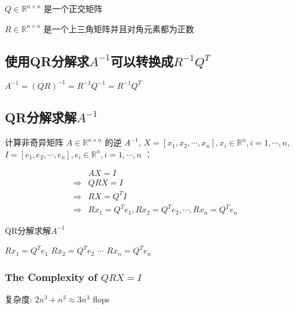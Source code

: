 \begin{corollary}
    $ Q \in \mathbb{R}^{n \times n} $ 是一个正交矩阵
\end{corollary}

\begin{corollary}
    $ R \in \mathbb{R}^{n \times n} $ 是一个上三角矩阵并且对角元素都为正数
\end{corollary}


\subsection{使用QR分解求$A^{-1}$可以转换成$R^{-1} Q^{T}$}

\begin{theorem}
    $ A^{-1}=(Q R)^{-1}=R^{-1} Q^{-1}=R^{-1} Q^{T} $
\end{theorem}

\subsection{QR分解求解$A^{-1}$}


计算非奇异矩阵 $  {A} \in \mathbb{R}^{n \times n} $ 的逆 $  {A}^{-1} $, $X=\left[x_{1}, x_{2}, \cdots, x_{n}\right], x_{i} \in \mathbb{R}^{n}, i=1, \cdots, n$,$I=\left[e_{1}, e_{2}, \cdots, e_{n}\right], e_{i} \in \mathbb{R}^{n}, i=1, \cdots, n$
：


\begin{equation}\begin{aligned}
    &AX = I \\
    \Rightarrow&   Q R X=I \\
    \Rightarrow&   R X =Q^{T} I \\
    \Rightarrow&  R x_{1}= Q^{T} e_{1}, R x_{2}=Q^{T} e_{2}, \cdots, R x_{n}=Q^{T} e_{n}
\end{aligned}\end{equation}

\begin{algorithm}[htbp]
    \caption{QR分解求解$A^{-1}$}
    $R x_{1}= Q^{T} e_{1}$\;
    $R x_{2}=Q^{T} e_{2}$\;
    $\cdots$\;
    $R x_{n}=Q^{T} e_{n}$\;
\end{algorithm}

\subsubsection{The Complexity of $ Q R X=I $}
\label{complexity:QRX-eqs-I}

复杂度: $ 2 n^{3}+n^{3} \approx 3 n^{3} $ flops

